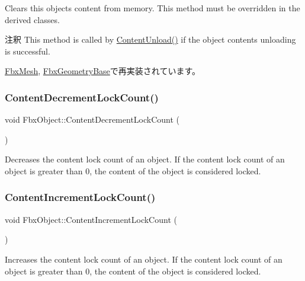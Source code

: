 Clears this object\textquotesingle{}s content from memory. This method must be overridden in the derived classes. \begin{DoxyRemark}{注釈}
This method is called by \hyperlink{class_fbx_object_ac28653a3c65e840498eebfb54276e483}{Content\+Unload()} if the object content\textquotesingle{}s unloading is successful. 
\end{DoxyRemark}


\hyperlink{class_fbx_mesh_aacd77ff7908d897c73983919c4aade72}{Fbx\+Mesh}, \hyperlink{class_fbx_geometry_base_acf13ddd2717d2f1ca4dc57b5ea0801b1}{Fbx\+Geometry\+Base}で再実装されています。

\mbox{\label{class_fbx_object_a7720b36c508a8c32c9cf72a7a59f5c3e}} 
\subsubsection{\texorpdfstring{Content\+Decrement\+Lock\+Count()}{ContentDecrementLockCount()}}
{\footnotesize\ttfamily void Fbx\+Object\+::\+Content\+Decrement\+Lock\+Count (\begin{DoxyParamCaption}{ }\end{DoxyParamCaption})}

Decreases the content lock count of an object. If the content lock count of an object is greater than 0, the content of the object is considered locked. \mbox{\label{class_fbx_object_a83ebb7c4a09328e517a4b5367fcf8c0d}} 
\subsubsection{\texorpdfstring{Content\+Increment\+Lock\+Count()}{ContentIncrementLockCount()}}
{\footnotesize\ttfamily void Fbx\+Object\+::\+Content\+Increment\+Lock\+Count (\begin{DoxyParamCaption}{ }\end{DoxyParamCaption})}

Increases the content lock count of an object. If the content lock count of an object is greater than 0, the content of the object is considered locked. \mbox{\label{class_fbx_object_ac1e5a81afa5c74aec67c57136b541161}} 
